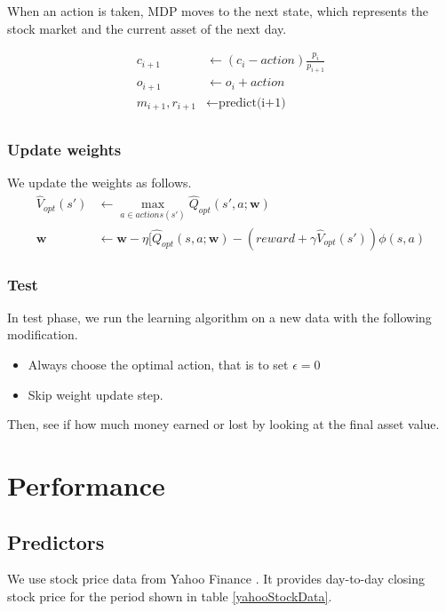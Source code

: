 \documentclass[twocolumn,10pt]{asme2ej}
\newcommand{\vect}[1]{\boldsymbol{#1}}
\begin{document}
When an action is taken, MDP moves to the next state, which represents
the stock market and the current asset of the next day.

\begin{align*}
  c_{i+1} &\gets (c_{i} - action)\frac{p_i}{p_{i+1}} \\
  o_{i+1} &\gets o_{i} + action \\
  m_{i+1}, r_{i+1} &\gets \text{predict(i+1)} \\
\end{align*}

\subsubsection*{Update weights}

We update the weights as follows.
\begin{align*}
\hat{V}_{opt}(s') &\gets \max_{a \in actions(s')}\hat{Q}_{opt}(s', a;\vect{w}) \\
\vect{w} &\gets \vect{w} - \eta[\hat{Q}_{opt}(s, a;\vect{w}) - (reward + \gamma \hat{V}_{opt}(s'))\phi(s,a)
\end{align*}

\subsubsection{Test}

In test phase, we run the learning algorithm on a new data with the
following modification.

\begin{itemize}
\item Always choose the optimal action, that is to set $\epsilon = 0$
\item Skip weight update step.
\end{itemize}

Then, see if how much money earned or lost by looking at the final
asset value.


\section{Performance}

\subsection{Predictors}

We use stock price data from Yahoo Finance
\cite{web:yahoo_finance}. It provides day-to-day closing stock price
for the period shown in table \ref{yahooStockData}.
\end{document}
